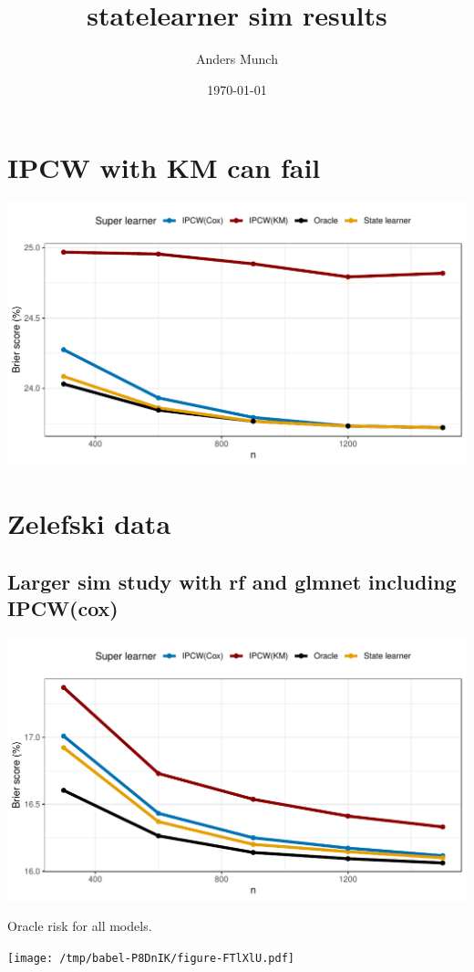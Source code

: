 \documentclass[11pt]{article}
\author{Anders Munch}
\date{\today}
\title{statelearner sim results}
\begin{document}
\maketitle

\section{IPCW with KM can fail}
\label{sec:org87e728e}
\begin{center}
\includegraphics[width=.9\linewidth]{ipcw-fail.pdf}
\end{center}


\section{Zelefski data}
\label{sec:orgffdb325}
\subsection{Larger sim study with rf and glmnet including IPCW(cox)}
\label{sec:org14cd83f}

\begin{center}
\includegraphics[width=.9\linewidth]{zelefski-sim.pdf}
\end{center}

Oracle risk for all models.

\begin{center}
\texttt{[image: /tmp/babel-P8DnIK/figure-FTlXlU.pdf]}
\end{center}
\end{document}
